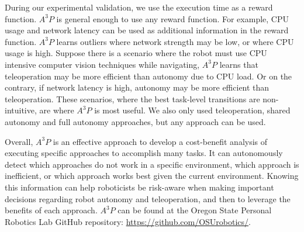 \documentclass[letterpaper, 10 pt, conference]{ieeeconf}  %
\begin{document}
During our experimental validation, we use the execution time as a reward function. $A^3P$ is general enough to use any reward function. For example, CPU usage and network latency can be used as additional information in the reward function. $A^3P$ learns outliers where network strength may be low, or where CPU usage is high. Suppose there is a scenario where the robot must use CPU intensive computer vision techniques while navigating, $A^3P$ learns that teleoperation may be more efficient than autonomy due to CPU load. Or on the contrary, if network latency is high, autonomy may be more efficient than teleoperation. These scenarios, where the best task-level transitions are non-intuitive, are where $A^3P$ is most useful. We also only used teleoperation, shared autonomy and full autonomy approaches, but any approach can be used.

Overall, $A^3P$ is an effective approach to develop a cost-benefit analysis of executing specific approaches to accomplish many tasks. It can autonomously detect which approaches do not work in a specific environment, which approach is inefficient, or which approach works best given the current environment. Knowing this information can help roboticists be risk-aware when making important decisions regarding robot autonomy and teleoperation, and then to leverage the benefits of each approach. $A^3P$ can be found at the Oregon State Personal Robotics Lab GitHub repository: \url{https://github.com/OSUrobotics/}.




\end{document}

